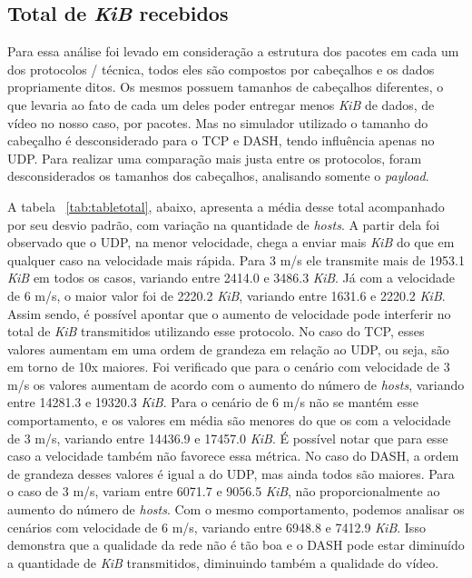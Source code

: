 \documentclass[12pt]{article}
\begin{document}
\subsection{Total de \textit{KiB} recebidos} \label{sec:total}
	Para essa análise foi levado em consideração a estrutura dos pacotes em cada um dos protocolos / técnica, todos eles são compostos por cabeçalhos e os dados propriamente ditos. Os mesmos possuem tamanhos de cabeçalhos diferentes, o que levaria ao fato de cada um deles poder entregar menos \textit{KiB} de dados, de vídeo no nosso caso, por pacotes. Mas no simulador utilizado o tamanho do cabeçalho é desconsiderado para o TCP e DASH, tendo influência apenas no UDP. Para realizar uma comparação mais justa entre os protocolos, foram desconsiderados os tamanhos dos cabeçalhos, analisando somente o \textit{payload}. 
    
    A tabela ~\ref{tab:tabletotal}, abaixo, apresenta a média desse total acompanhado por seu desvio padrão, com variação na quantidade de \textit{hosts}. A partir dela foi observado que o UDP, na menor velocidade, chega a enviar mais \textit{KiB} do que em qualquer caso na velocidade mais rápida. Para 3 m/s ele transmite mais de 1953.1 \textit{KiB} em todos os casos, variando entre 2414.0 e 3486.3 \textit{KiB}. Já com a velocidade de 6 m/s, o maior valor foi de 2220.2 \textit{KiB}, variando entre 1631.6 e 2220.2 \textit{KiB}. Assim sendo, é possível apontar que o aumento de velocidade pode interferir no total de \textit{KiB} transmitidos utilizando esse protocolo. No caso do TCP, esses valores aumentam em uma ordem de grandeza em relação ao UDP, ou seja, são em torno de 10x maiores. Foi verificado que para o cenário com velocidade de 3 m/s os valores aumentam de acordo com o aumento do número de \textit{hosts}, variando entre 14281.3 e 19320.3 \textit{KiB}. Para o cenário de 6 m/s não se mantém esse comportamento, e os valores em média são menores do que os com a velocidade de 3 m/s, variando entre 14436.9 e 17457.0 \textit{KiB}. É possível notar que para esse caso a velocidade também não favorece essa métrica. No caso do DASH, a ordem de grandeza desses valores é igual a do UDP, mas ainda todos são maiores. Para o caso de 3 m/s, variam entre 6071.7 e 9056.5 \textit{KiB}, não proporcionalmente ao aumento do número de \textit{hosts}. Com o mesmo comportamento, podemos analisar os cenários com velocidade de 6 m/s, variando entre 6948.8 e 7412.9 \textit{KiB}. Isso demonstra que a qualidade da rede não é tão boa e o DASH pode estar diminuído a quantidade de \textit{KiB} transmitidos, diminuindo também a qualidade do vídeo.
    
\end{document}
